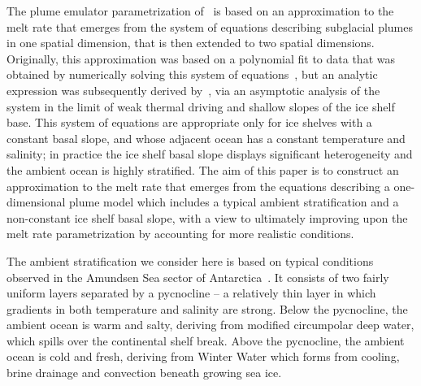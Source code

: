 \documentclass[openacc]{rsproca_new}%
\begin{document}
The plume emulator parametrization of~\cite{Lazeroms2018TheCryo} is based on an approximation to the melt rate that emerges from the system of equations describing subglacial plumes in one spatial dimension, that is then extended to two spatial dimensions. Originally, this approximation was based on a polynomial fit to data that was obtained by numerically solving this system of equations~\citep{Jenkins2014scaling}, but an analytic expression was subsequently derived by~\cite{Lazeroms2019JPhysOcean}, via an asymptotic analysis of the system in the limit of weak thermal driving and shallow slopes of the ice shelf base. This system of equations are appropriate only for ice shelves with a constant basal slope, and whose adjacent ocean has a constant temperature and salinity; in practice the ice shelf basal slope displays significant heterogeneity and the ambient ocean is highly stratified. The aim of this paper is to construct an approximation to the melt rate that emerges from the equations describing a one-dimensional plume model which includes a typical ambient stratification and a non-constant ice shelf basal slope, with a view to ultimately improving upon the~\cite{Lazeroms2018TheCryo} melt rate parametrization by accounting for more realistic conditions.

The ambient stratification we consider here is based on typical conditions observed in the Amundsen Sea sector of Antarctica~\cite{Jenkins2018NatureGeo}. It consists of two fairly uniform layers separated by a pycnocline -- a relatively thin layer in which gradients in both temperature and salinity are strong. Below the pycnocline, the ambient ocean is warm and salty, deriving from modified circumpolar deep water, which spills over the continental shelf break. Above the pycnocline, the ambient ocean is cold and fresh, deriving from Winter Water which forms from cooling, brine drainage and convection beneath growing sea ice.
\end{document}
